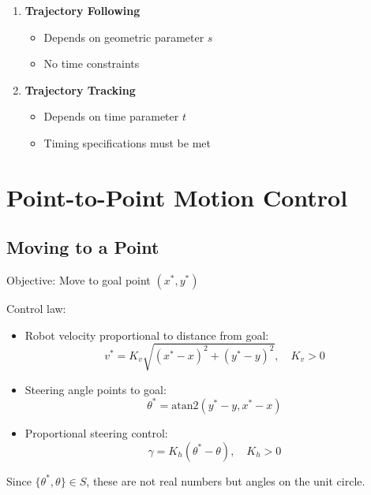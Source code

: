 \documentclass[openany]{book}
\theoremstyle{definition}
\theoremstyle{remark}
\newcommand{\note}[1]{
\begin{tcolorbox}[colback=green!5,colframe=green!40!black,title=Note]
 #1
\end{tcolorbox}
}
\begin{document}
\begin{enumerate}
    \item \textbf{Trajectory Following}
        \begin{itemize}
            \item Depends on geometric parameter $s$
            \item No time constraints
        \end{itemize}
        
    \item \textbf{Trajectory Tracking}
        \begin{itemize}
            \item Depends on time parameter $t$
            \item Timing specifications must be met
        \end{itemize}
\end{enumerate}

\section{Point-to-Point Motion Control}

\subsection{Moving to a Point}
Objective: Move to goal point $(x^*, y^*)$

Control law:
\begin{itemize}
    \item Robot velocity proportional to distance from goal:
        \begin{equation}
            v^* = K_v\sqrt{(x^* - x)^2 + (y^* - y)^2}, \quad K_v > 0
        \end{equation}
    
    \item Steering angle points to goal:
        \begin{equation}
            \theta^* = \text{atan2}(y^* - y, x^* - x)
        \end{equation}
    
    \item Proportional steering control:
        \begin{equation}
            \gamma = K_h(\theta^* - \theta), \quad K_h > 0
        \end{equation}
\end{itemize}

\note{Since $\{\theta^*, \theta\} \in S$, these are not real numbers but angles on the unit circle.}
\end{document}
